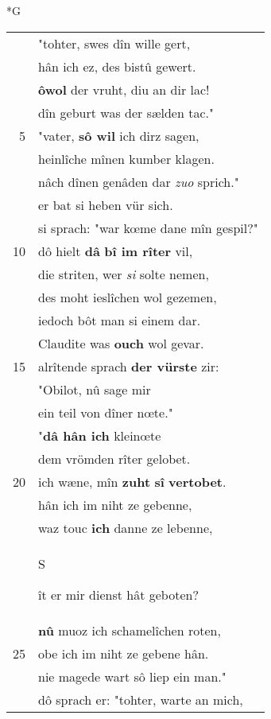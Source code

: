\documentclass[8pt,a4paper,notitlepage]{article}
\begin{document}
\begin{table}[ht]
\begin{minipage}[t]{0.5\linewidth}
\small
\begin{center}*G
\end{center}
\begin{tabular}{rl}
 & "tohter, swes dîn wille gert,\\ 
 & hân ich ez, des bistû gewert.\\ 
 & \textbf{ôwol} der vruht, diu an dir lac!\\ 
 & dîn geburt was der sælden tac."\\ 
5 & "vater, \textbf{sô wil} ich dirz sagen,\\ 
 & heinlîche mînen kumber klagen.\\ 
 & nâch dînen genâden dar \textit{zuo} sprich."\\ 
 & er bat si heben vür sich.\\ 
 & si sprach: "war kœme dane mîn gespil?"\\ 
10 & dô hielt \textbf{dâ} \textbf{bî im rîter} vil,\\ 
 & die striten, wer \textit{si} solte nemen,\\ 
 & des moht ieslîchen wol gezemen,\\ 
 & iedoch bôt man si einem dar.\\ 
 & Claudite was \textbf{ouch} wol gevar.\\ 
15 & alrîtende sprach \textbf{der vürste} zir:\\ 
 & "Obilot, nû sage mir\\ 
 & ein teil von dîner nœte."\\ 
 & "\textbf{dâ hân ich} kleinœte\\ 
 & dem vrömden rîter gelobet.\\ 
20 & ich wæne, mîn \textbf{zuht} \textbf{sî} \textbf{vertobet}.\\ 
 & hân ich im niht ze gebenne,\\ 
 & waz touc \textbf{ich} danne ze lebenne,\\ 
 & \begin{large}S\end{large}ît er mir dienst hât geboten?\\ 
 & \textbf{nû} muoz ich schamelîchen roten,\\ 
25 & obe ich im niht ze gebene hân.\\ 
 & nie magede wart sô liep ein man."\\ 
 & dô sprach er: "tohter, warte an mich,\\ 

\end{tabular}
\end{minipage}
\end{table}
\end{document}
